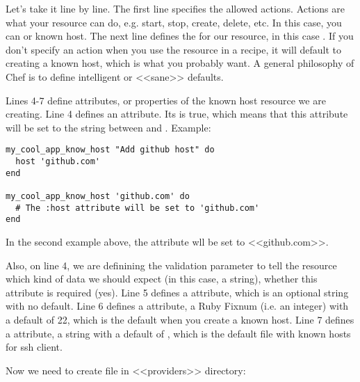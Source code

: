 Let's take it line by line. The first line specifies the allowed actions. Actions are what your resource can do, e.g. start, stop, create, delete, etc. In this case, you can  or  known host. The next line defines the  for our resource, in this case . If you don't specify an action when you use the resource in a recipe, it will default to creating a known host, which is what you probably want. A general philosophy of Chef is to define intelligent or <<sane>> defaults.

Lines 4-7 define attributes, or properties of the known host resource we are creating. Line 4 defines an  attribute. Its  is true, which means that this attribute will be set to the string between  and . Example:

\begin{lstlisting}[label=lst:cookbook-lwrp2]
my_cool_app_know_host "Add github host" do
  host 'github.com'
end

my_cool_app_know_host 'github.com' do
  # The :host attribute will be set to 'github.com'
end
\end{lstlisting}

In the second example above, the  attribute wll be set to <<github.com>>.

Also, on line 4, we are definining the  validation parameter to tell the resource which kind of data we should expect (in this case, a string), whether this attribute is required (yes). Line 5 defines a  attribute, which is an optional string with no default. Line 6 defines a  attribute, a Ruby Fixnum (i.e. an integer) with a default of 22, which is the default when you create a known host. Line 7 defines a  attribute, a string with a default of , which is the default file with known hosts for ssh client.

Now we need to create file  in <<providers>> directory:

